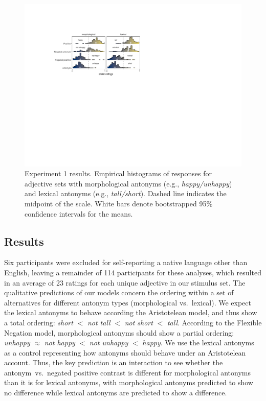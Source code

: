 \documentclass[floatsintext,doc]{apa6}
\newcommand{\ourmodel}{Flexible Negation\xspace}
\begin{document}
\begin{figure}[h]
\centering \includegraphics[width=0.95\linewidth]{figs/expt1_directlabel_hist} 
\caption{ Experiment 1 results. Empirical histograms of responses for adjective sets with morphological antonyms (e.g., \emph{happy/unhappy}) and lexical antonyms (e.g., \emph{tall/short}). Dashed line indicates the midpoint of the scale.  White bars denote bootstrapped 95\% confidence intervals for the means.}\label{fig:expt1-results}
\end{figure}
\subsection{Results}\label{results}%

Six participants were excluded for self-reporting a native language other than English, leaving a remainder of 114 participants for these analyses, which resulted in an average of 23 ratings for each unique adjective in our stimulus set.
The qualitative predictions of our models concern the ordering within a set of alternatives for different antonym types (morphological vs.~lexical).
We expect the lexical antonyms to behave according the Aristotelean model, and thus show a total ordering: \emph{short} $<$ \emph{not tall} $<$ \emph{not short} $<$ \emph{tall}. 
According to the \ourmodel model, morphological antonyms should show a partial ordering: \emph{unhappy} $\approx$ \emph{not happy} $<$ \emph{not unhappy} $<$ \emph{happy}. 
We use the lexical antonyms as a control representing how antonyms should behave under an Aristotelean account. Thus, the key prediction is an interaction to see whether the antonym~vs.~negated positive contrast is different for morphological antonyms than it is for lexical antonyms, with morphological antonyms predicted to show no difference while lexical antonyms are predicted to show a difference.
\end{document}
